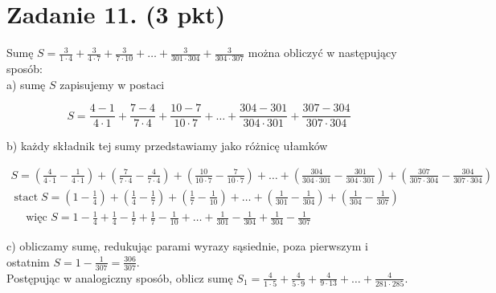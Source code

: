 \documentclass[10pt]{article}
\begin{document}
\section*{Zadanie 11. (3 pkt)}
Sumę \(S=\frac{3}{1 \cdot 4}+\frac{3}{4 \cdot 7}+\frac{3}{7 \cdot 10}+\ldots+\frac{3}{301 \cdot 304}+\frac{3}{304 \cdot 307}\) można obliczyć w następujący sposób:\\
a) sumę \(S\) zapisujemy w postaci

\[
S=\frac{4-1}{4 \cdot 1}+\frac{7-4}{7 \cdot 4}+\frac{10-7}{10 \cdot 7}+\ldots+\frac{304-301}{304 \cdot 301}+\frac{307-304}{307 \cdot 304}
\]

b) każdy składnik tej sumy przedstawiamy jako różnicę ułamków

\[
\begin{gathered}
S=\left(\frac{4}{4 \cdot 1}-\frac{1}{4 \cdot 1}\right)+\left(\frac{7}{7 \cdot 4}-\frac{4}{7 \cdot 4}\right)+\left(\frac{10}{10 \cdot 7}-\frac{7}{10 \cdot 7}\right)+\ldots+\left(\frac{304}{304 \cdot 301}-\frac{301}{304 \cdot 301}\right)+\left(\frac{307}{307 \cdot 304}-\frac{304}{307 \cdot 304}\right) \\
\operatorname{stact} S=\left(1-\frac{1}{4}\right)+\left(\frac{1}{4}-\frac{1}{7}\right)+\left(\frac{1}{7}-\frac{1}{10}\right)+\ldots+\left(\frac{1}{301}-\frac{1}{304}\right)+\left(\frac{1}{304}-\frac{1}{307}\right) \\
\quad \text { więc } S=1-\frac{1}{4}+\frac{1}{4}-\frac{1}{7}+\frac{1}{7}-\frac{1}{10}+\ldots+\frac{1}{301}-\frac{1}{304}+\frac{1}{304}-\frac{1}{307}
\end{gathered}
\]

c) obliczamy sumę, redukując parami wyrazy sąsiednie, poza pierwszym i ostatnim \(S=1-\frac{1}{307}=\frac{306}{307}\).\\
Postępując w analogiczny sposób, oblicz sumę \(S_{1}=\frac{4}{1 \cdot 5}+\frac{4}{5 \cdot 9}+\frac{4}{9 \cdot 13}+\ldots+\frac{4}{281 \cdot 285}\).
\end{document}

